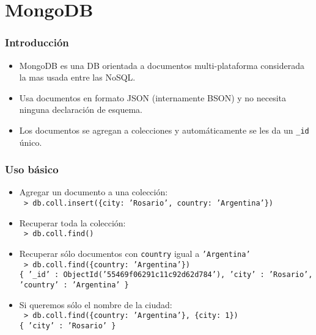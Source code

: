 \section{MongoDB}

\begin{frame}
\frametitle{Introducción}
\begin{itemize}

\item	MongoDB es una DB orientada a documentos multi-plataforma
	considerada la mas usada entre las NoSQL.
	\pause

\item	Usa documentos en formato JSON (internamente BSON) y no necesita
	ninguna declaración de esquema.
	\pause

\item	Los documentos se agregan a colecciones y automáticamente se les
	da un \texttt{\_id} único.
\end{itemize}
\end{frame}

\begin{frame}
\frametitle{Uso básico}
\begin{itemize}

\item	Agregar un documento a una colección: \\
	\texttt{\footnotesize
		> db.coll.insert(\{city: 'Rosario', country: 'Argentina'\})
	}
	\pause

\item	Recuperar toda la colección: \\
	\texttt{\footnotesize
		> db.coll.find()
	}
	\pause

\item	Recuperar sólo documentos con \texttt{country} igual a
	\texttt{'Argentina'} \\
	\texttt{\footnotesize
		> db.coll.find(\{country: 'Argentina'\}) \\
		\{ '\_id' : ObjectId('55469f06291c11c92d62d784'), 'city' : 'Rosario', 'country' : 'Argentina' \}
	}
	\pause

\item	Si queremos sólo el nombre de la ciudad: \\
	\texttt{\footnotesize
		> db.coll.find(\{country: 'Argentina'\}, \{city: 1\}) \\
		\{ 'city' : 'Rosario' \}
	}

\end{itemize}
\end{frame}

